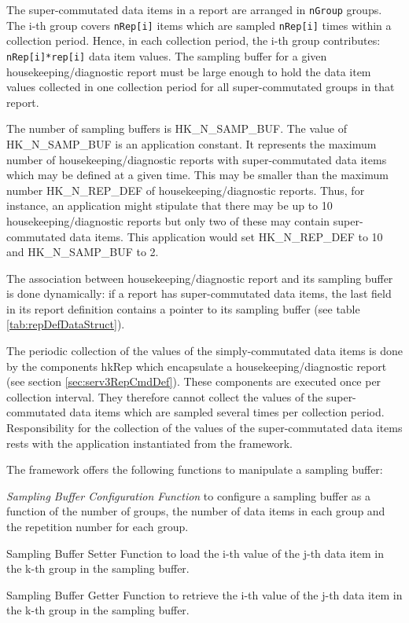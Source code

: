 \documentclass[a4paper,10pt]{article}
\newenvironment{fw_itemize}						%
{\begin{itemize}
  \setlength{\itemsep}{1mm}
  \setlength{\parskip}{0pt}
  \setlength{\parsep}{0pt}}
{\end{itemize}}
\begin{document}
The super-commutated data items in a report are arranged in \texttt{nGroup} groups. The i-th group covers \texttt{nRep[i]} items which are sampled \texttt{nRep[i]} times within a collection period. Hence, in each collection period, the i-th group contributes: \texttt{nRep[i]*rep[i]} data item values. The sampling buffer for a given housekeeping/diagnostic report must be large enough to hold the data item values collected in one collection period for all super-commutated groups in that report.

The number of sampling buffers is HK\_N\_SAMP\_BUF. The value of HK\_N\_SAMP\_BUF is an application constant. It represents the maximum number of housekeeping/diagnostic reports with super-commutated data items which may be defined at a given time. This may be smaller than the maximum number HK\_N\_REP\_DEF of housekeeping/diagnostic reports. Thus, for instance, an application might stipulate that there may be up to 10 housekeeping/diagnostic reports but only two of these may contain super-commutated data items. This application would set HK\_N\_REP\_DEF to 10 and  HK\_N\_SAMP\_BUF to 2.

The association between housekeeping/diagnostic report and its sampling buffer is done dynamically: if a report has super-commutated data items, the last field in its report definition contains a pointer to its sampling buffer (see table \ref{tab:repDefDataStruct}).

The periodic collection of the values of the simply-commutated data items is done by the components hkRep which encapsulate a housekeeping/diagnostic report (see section \ref{sec:serv3RepCmdDef}). These components are executed once per collection interval. They therefore cannot collect the values of the super-commutated data items which are sampled several times per collection period. Responsibility for the collection of the values of the super-commutated data items rests with the application instantiated from the framework. 

The framework offers the following functions to manipulate a sampling buffer:

\begin{fw_itemize}
\item \textit{Sampling Buffer Configuration Function} to configure a sampling buffer as a function of the number of groups, the number of data items in each group and the repetition number for each group.
\item Sampling Buffer Setter Function to load the i-th value of the j-th data item in the k-th group in the sampling buffer.
\item Sampling Buffer Getter Function to retrieve the i-th value of the j-th data item in the k-th group in the sampling buffer.
\end{fw_itemize}
\end{document}
